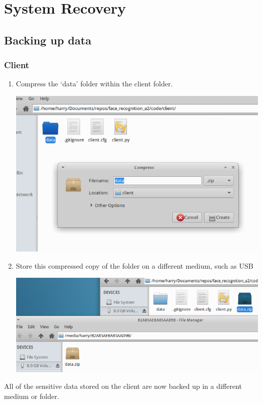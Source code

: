 \documentclass[a4paper]{article}
\begin{document}
\section{System Recovery}
    \newpage
    \subsection{Backing up data}
        \subsubsection{Client}
            \begin{enumerate}
                \item Compress the `data' folder within the client folder.
                \begin{center}
                \includegraphics[scale=0.4]{../shared_assets/screenshots/manual/compressclientdata.png}
                \end{center}
                \item Store this compressed copy of the folder on a different medium, such as USB
                \begin{center}
                \includegraphics[scale=0.4]{../shared_assets/screenshots/manual/clientstoredusb.png}
                \end{center}
            \end{enumerate}
            All of the sensitive data stored on the client are now backed up in a different medium or folder.
        \newpage
\end{document}
